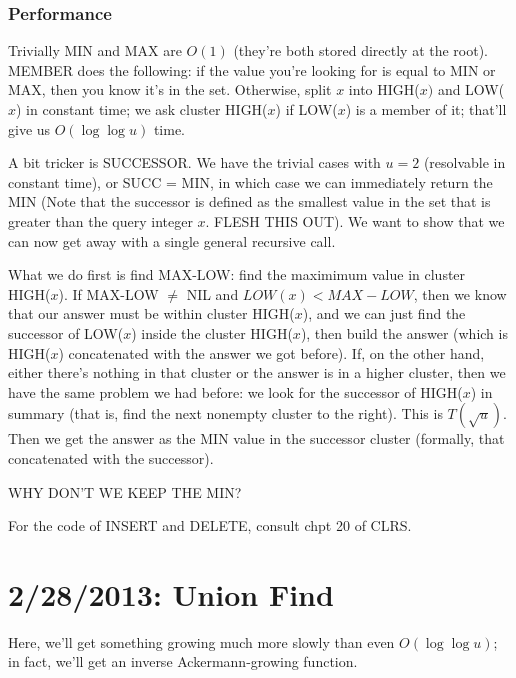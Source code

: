 \documentclass{article}
\begin{document}
\subsubsection{Performance}

Trivially MIN and MAX are $O(1)$ (they're both stored directly at the root).
MEMBER does the following: if the value you're looking for is equal to
MIN or MAX, then you know it's in the set.
Otherwise, split $x$ into HIGH($x)$ and LOW($x$) in constant time; we ask
cluster HIGH($x$) if LOW($x$) is a member of it; that'll give us
$O(\log\log u)$ time.

A bit tricker is SUCCESSOR.
We have the trivial cases with $u=2$ (resolvable in constant time), or
SUCC = MIN,
in which case we can immediately return the MIN (Note that the successor
is defined as the smallest value in the set that is greater than the
query integer $x$. FLESH THIS OUT).
We want to show that we can now get away with a single general recursive
call.

What we do first is find MAX-LOW: find the maximimum value in
cluster HIGH($x$).
If MAX-LOW $\neq$ NIL and $LOW(x) < MAX-LOW$, then we know that our answer
must be within cluster HIGH($x$), and we can just find the successor
of LOW($x$) inside the cluster HIGH($x$), then build the answer (which is
HIGH($x$) concatenated with the answer we got before).
If, on the other hand, either there's nothing in that cluster or the answer
is in a higher cluster, then we have the same problem we had
before: we look for the successor of HIGH($x$) in summary (that is, find the
next nonempty cluster to the right). This is $T(\sqrt u)$.
Then we get the answer as the MIN value in the successor cluster (formally,
that concatenated with the successor).

WHY DON'T WE KEEP THE MIN?


For the code of INSERT and DELETE, consult chpt 20 of CLRS.



\section{2/28/2013: Union Find}

Here, we'll get something growing much more slowly than even $O(\log\log u)$;
in fact, we'll get an inverse Ackermann-growing function.
\end{document}
